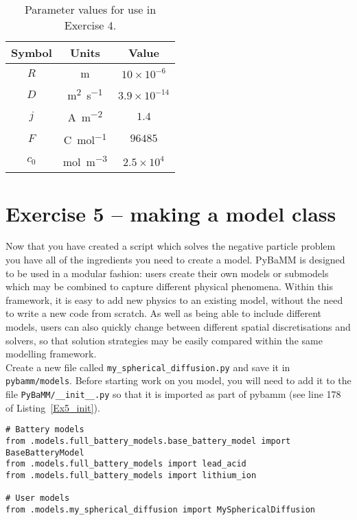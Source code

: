 \documentclass[a4paper,11pt]{article}
\begin{document}
\begin{table}[htb]
	\centering
	\begin{tabular}{c c c}
	\toprule
     Symbol & Units & Value \\
    \midrule
    $R$ & \si{m} & $10 \times 10^{-6}$\\
    $D$ & \si{m^2.s^{-1}} & $3.9 \times 10^{-14}$ \\
    $j$ & \si{A.m^{-2}} & $1.4$ \\
    $F$ & \si{C.mol^{-1}} & $96485$ \\
    $c_0$ & \si{mol.m^{-3}} & $2.5 \times 10^4$ \\
    \bottomrule
    \end{tabular}
    \caption{Parameter values for use in Exercise 4.}
    \label{Table:Ex4}
\end{table}

\pagebreak
\section*{Exercise 5 -- making a model class}
Now that you have created a script which solves the negative particle problem you have all of the ingredients you need to create a model. PyBaMM is designed to be used in a modular fashion: users create their own models or submodels which may be combined to capture different physical phenomena. Within this framework, it is easy to add new physics to an existing model, without the need to write a new code from scratch. As well as being able to include different models, users can also quickly change between different spatial discretisations and solvers, so that solution strategies may be easily compared within the same modelling framework. \\

Create a new file called \texttt{my\_spherical\_diffusion.py} and save it in \texttt{pybamm/models}. Before starting work on you model, you will need to add it to the file \texttt{PyBaMM/\_\_init\_\_.py} so that it is imported as part of pybamm (see line 178 of Listing~\ref{Ex5_init}).

\begin{lstlisting}[label={Ex5_init},caption=Adding you new model to the init file., firstnumber=172]
# Battery models
from .models.full_battery_models.base_battery_model import BaseBatteryModel
from .models.full_battery_models import lead_acid
from .models.full_battery_models import lithium_ion

# User models
from .models.my_spherical_diffusion import MySphericalDiffusion
\end{lstlisting}
\end{document}
